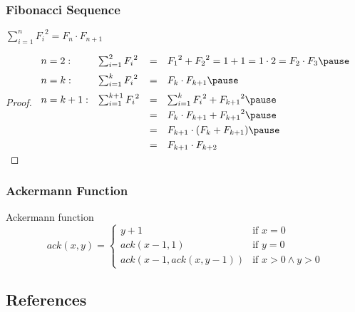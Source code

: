 \documentclass[dvipsnames]{beamer}
\begin{document}
\begin{frame}
  \frametitle{Fibonacci Sequence}

  \begin{theorem}
    $\sum_{i=1}^{n} {F_i}^2 = F_n \cdot F_{n+1}$
  \end{theorem}

  \pause
  \begin{proof}
    $\begin{array}{llcl}
      n=2:   & \sum_{i=1}^{2} {F_i}^2   & = & {F_1}^2+{F_2}^2=1+1=1 \cdot 2=F_2 \cdot F_3
      \pause
      \medskip\\
      n=k:   & \sum_{i=1}^{k} {F_i}^2   & = & F_k \cdot F_{k+1}
      \pause
      \medskip\\
      n=k+1: & \sum_{i=1}^{k+1} {F_i}^2 & = & \sum_{i=1}^{k} {F_i}^2 + {F_{k+1}}^2
      \pause
      \smallskip\\
             &                          & = & F_k \cdot F_{k+1} + {F_{k+1}}^2
      \pause
      \smallskip\\
             &                          & = & F_{k+1} \cdot (F_k + F_{k+1})
      \pause
      \smallskip\\
             &                          & = & F_{k+1} \cdot F_{k+2}
    \end{array}$
  \end{proof}
\end{frame}

\begin{frame}
  \frametitle{Ackermann Function}

  \begin{block}{Ackermann function}
    \[
    ack(x,y) =
      \begin{cases}
        y+1                 & \mbox{if } x = 0\\
        ack(x-1, 1)         & \mbox{if } y = 0\\
        ack(x-1,ack(x,y-1)) & \mbox{if } x > 0 \wedge y > 0
      \end{cases}
    \]
  \end{block}
\end{frame}

\subsection*{References}
\end{document}
